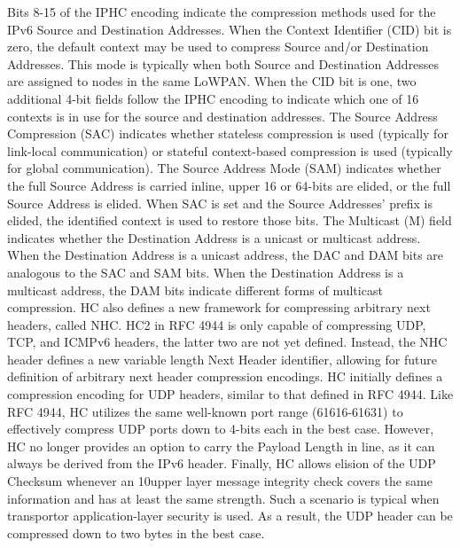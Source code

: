 Bits 8-15 of the IPHC encoding indicate the compression methods used for the IPv6 Source and Destination Addresses.
When the Context Identifier (CID) bit is zero,
	the default context may be used to compress Source and/or Destination Addresses.
This mode is typically when both Source and Destination Addresses are assigned to nodes in the same LoWPAN.
When the CID bit is one,
	two additional 4-bit fields follow the IPHC encoding to indicate which one of 16 contexts is in use for the source and destination addresses.
The Source Address Compression (SAC) indicates whether stateless compression is used (typically for link-local communication) or stateful context-based compression is used (typically for global communication).
The Source Address Mode (SAM) indicates whether the full Source Address is carried inline,
	upper 16 or 64-bits are elided,
	or the full Source Address is elided.
When SAC is set and the Source Addresses’ prefix is elided,
	the identified context is used to restore those bits.
The Multicast (M) field indicates whether the Destination Address is a unicast or multicast address.
When the Destination Address is a unicast address,
	the DAC and DAM bits are analogous to the SAC and SAM bits.
When the Destination Address is a multicast address,
	the DAM bits indicate different forms of multicast compression.
HC also defines a new framework for compressing arbitrary next headers,
	called NHC.
HC2 in RFC 4944 is only capable of compressing UDP,
	TCP,
	and ICMPv6 headers,
	the latter two are not yet defined.
Instead,
	the NHC header defines a new variable length Next Header identifier,
	allowing for future definition of arbitrary next header compression encodings.
HC initially defines a compression encoding for UDP headers,
	similar to that defined in RFC 4944.
Like RFC 4944,
	HC utilizes the same well-known port range (61616-61631) to effectively compress UDP ports down to 4-bits each in the best case.
However,
	HC no longer provides an option to carry the Payload Length in line,
	as it can always be derived from the IPv6 header.
Finally,
	HC allows elision of the UDP Checksum whenever an 10upper layer message integrity check covers the same information and has at least the same strength.
Such a scenario is typical when transportor application-layer security is used.
As a result,
	the UDP header can be compressed down to two bytes in the best case.


